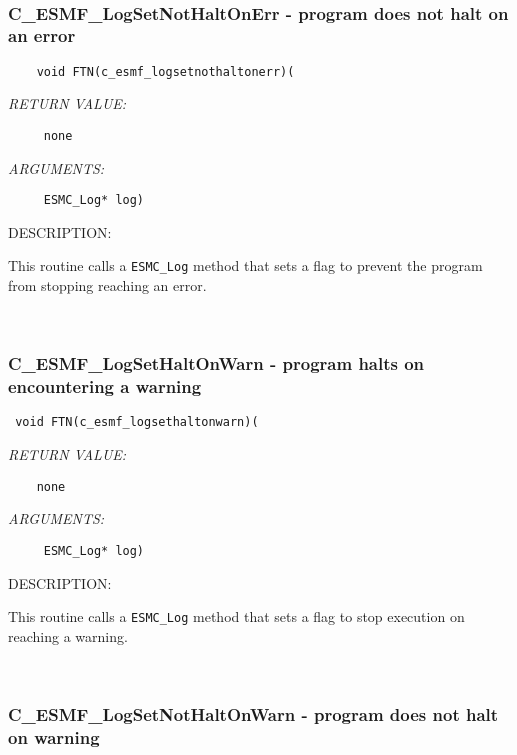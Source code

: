 \mbox{}\hrulefill\ 
 

  \subsubsection [C\_ESMF\_LogSetNotHaltOnErr] {C\_ESMF\_LogSetNotHaltOnErr - program does not halt on an error}


  
\begin{verbatim}    void FTN(c_esmf_logsetnothaltonerr)(\end{verbatim}{\em RETURN VALUE:}
\begin{verbatim}     none\end{verbatim}{\em ARGUMENTS:}
\begin{verbatim}     ESMC_Log* log)\end{verbatim}
{\sf DESCRIPTION:\\ }


      This routine calls a {\tt ESMC\_Log} method that sets a flag to 
      prevent the program
      from stopping reaching an error.  
 
\mbox{}\hrulefill\ 
 

  \subsubsection [C\_ESMF\_LogSetHaltOnWarn] {C\_ESMF\_LogSetHaltOnWarn - program halts on encountering a warning}


  
\begin{verbatim} void FTN(c_esmf_logsethaltonwarn)(\end{verbatim}{\em RETURN VALUE:}
\begin{verbatim}    none\end{verbatim}{\em ARGUMENTS:}
\begin{verbatim}     ESMC_Log* log)\end{verbatim}
{\sf DESCRIPTION:\\ }


      This routine calls a {\tt ESMC\_Log} method that sets a flag to stop execution on
      reaching a warning. 
 
\mbox{}\hrulefill\ 
 

  \subsubsection [C\_ESMF\_LogSetNotHaltOnWarn] {C\_ESMF\_LogSetNotHaltOnWarn - program does not halt on warning}


